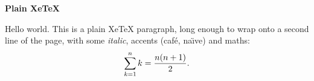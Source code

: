 \centerline{\bf Plain XeTeX}
\medskip
Hello world. This is a plain XeTeX paragraph, long enough to wrap onto a
second line of the page, with some {\it italic}, accents (caf\'e, na\"\i ve)
and maths:
$$\sum_{k=1}^n k = {n(n+1)\over 2}.$$
\bye
